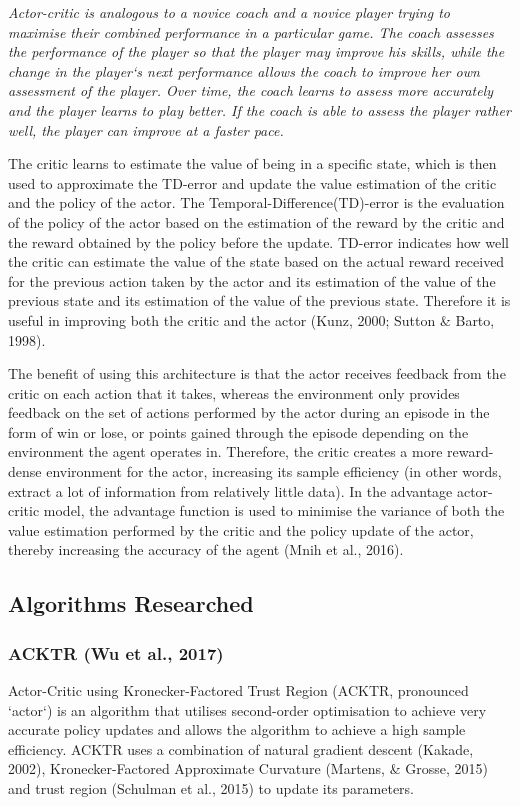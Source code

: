 \textit{Actor-critic is analogous to a novice coach and a novice player trying to maximise their combined performance in a particular game. The coach assesses the performance of the player so that the player may improve his skills, while the change in the player`s next performance allows the coach to improve her own assessment of the player. Over time, the coach learns to assess more accurately and the player learns to play better. If the coach is able to assess the player rather well, the player can improve at a faster pace.}

The critic learns to estimate the value of being in a specific state, which is then used to approximate the TD-error and update the value estimation of the critic and the policy of the actor. The Temporal-Difference(TD)-error is the evaluation of the policy of the actor based on the estimation of the reward by the critic and the reward obtained by the policy before the update. TD-error indicates how well the critic can estimate the value of the state based on the actual reward received for the previous action taken by the actor and its estimation of the value of the previous state and its estimation of the value of the previous state. Therefore it is useful in improving both the critic and the actor (Kunz, 2000; Sutton \& Barto, 1998). 

The benefit of using this architecture is that the actor receives feedback from the critic on each action that it takes, whereas the environment only provides feedback on the set of actions performed by the actor during an episode in the form of win or lose, or points gained through the episode depending on the environment the agent operates in. Therefore, the critic creates a more reward-dense environment for the actor, increasing its sample efficiency (in other words, extract a lot of information from relatively little data). In the advantage actor-critic model, the advantage function is used to minimise the variance of both the value estimation performed by the critic and the policy update of the actor, thereby increasing the accuracy of the agent (Mnih et al., 2016).

\subsection*{Algorithms Researched}
\subsubsection*{ACKTR (Wu et al., 2017)}
Actor-Critic using Kronecker-Factored Trust Region (ACKTR, pronounced `actor`) is an algorithm that utilises second-order optimisation to achieve very accurate policy updates and allows the algorithm to achieve a high sample efficiency. ACKTR uses a combination of natural gradient descent (Kakade, 2002), Kronecker-Factored Approximate Curvature (Martens, \& Grosse, 2015) and trust region (Schulman et al., 2015) to update its parameters. 

